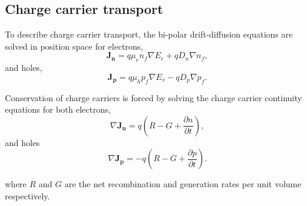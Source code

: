 \subsection{Charge carrier transport}
To describe charge carrier transport, the bi-polar drift-diffusion equations are solved in position space
for electrons,
\begin{equation}
\label{eq:ndrive}
\boldsymbol{J_n} = q \mu_e n_{f}  {\nabla E_{c}}  + q D_n  {\nabla n_{f}},
\end{equation}
and holes,
\begin{equation}
\label{eq:pdrive}
\boldsymbol{J_p} = q \mu_h p_{f}  {\nabla E_{v}}  - q D_p {\nabla p_{f}}.
\end{equation}

Conservation of charge carriers is forced by solving the charge carrier continuity equations for both electrons,
\begin{equation}
\label{eq:contn}
\nabla \boldsymbol{J_n}  = q (R-G+\frac{\partial n}{\partial t}),
\end{equation}
and holes
\begin{equation}
\label{eq:contp}
\nabla \boldsymbol{J_p} = - q (R-G+\frac{\partial p}{\partial t}).
\end{equation}

where $R$ and $G$ are the net recombination and generation rates per unit volume respectively.
